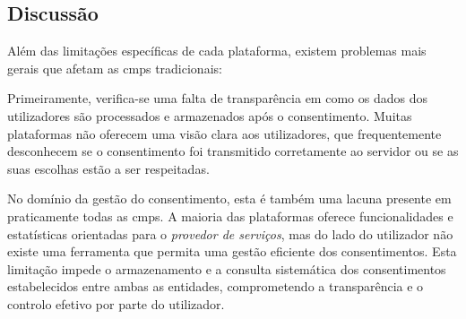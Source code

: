 \label{tab:cmp-caracteristicas}
\begin{table}[H]
\centering
\caption{Comparação das principais características das \acrshort{cmp}s existentes.}
\end{table}


\subsection{Discussão}

Além das limitações específicas de cada plataforma, existem problemas mais gerais que afetam as \acrshort{cmp}s tradicionais:

Primeiramente, verifica-se uma falta de transparência em como os dados dos utilizadores são processados e armazenados após o consentimento. Muitas plataformas não oferecem uma visão clara aos utilizadores, que frequentemente desconhecem se o consentimento foi transmitido corretamente ao servidor ou se as suas escolhas estão a ser respeitadas.

No domínio da gestão do consentimento, esta é também uma lacuna presente em praticamente todas as \acrshort{cmp}s. A maioria das plataformas oferece funcionalidades e estatísticas orientadas para o \textit{provedor de serviços}, mas do lado do utilizador não existe uma ferramenta que permita uma gestão eficiente dos consentimentos. Esta limitação impede o armazenamento e a consulta sistemática dos consentimentos estabelecidos entre ambas as entidades, comprometendo a transparência e o controlo efetivo por parte do utilizador.

